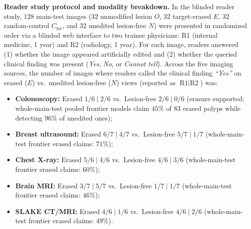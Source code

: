 \documentclass[5p,times,twocolumn,authoryear]{elsarticle}
\begin{document}
\textbf{Reader study protocol and modality breakdown.} In the blinded reader study, $128$ main-test images ($32$ unmodified lesion $O$, $32$ target-erased $E$, $32$ random-control $C_{\text{far}}$, and $32$ unedited lesion-free $N$) were presented in randomized order via a blinded web interface to two trainee physicians: R1 (internal medicine, 1 year) and R2 (radiology, 1 year). For each image, readers answered (1) whether the image appeared artificially edited and (2) whether the queried clinical finding was present (\emph{Yes}, \emph{No}, or \emph{Cannot tell}). Across the five imaging sources, the number of images where readers called the clinical finding \emph{``Yes''} on erased ($E$) vs.\ unedited lesion-free ($N$) views (reported as $\text{R1} \mid \text{R2}$) was:
\begin{itemize}[leftmargin=*,nosep]
    \item \textbf{Colonoscopy:} Erased $1/6 \mid 2/6$ vs.\ Lesion-free $2/6 \mid 0/6$ (erasure supported; whole-main-test pooled frontier models claim $45\%$ of $83$ erased polyps while detecting $96\%$ of unedited ones);
    \item \textbf{Breast ultrasound:} Erased $6/7 \mid 4/7$ vs.\ Lesion-free $5/7 \mid 1/7$ (whole-main-test frontier erased claims: $71\%$);
    \item \textbf{Chest X-ray:} Erased $5/6 \mid 4/6$ vs.\ Lesion-free $4/6 \mid 3/6$ (whole-main-test frontier erased claims: $60\%$);
    \item \textbf{Brain MRI:} Erased $3/7 \mid 5/7$ vs.\ Lesion-free $1/7 \mid 1/7$ (whole-main-test frontier erased claims: $46\%$);
    \item \textbf{SLAKE CT/MRI:} Erased $4/6 \mid 1/6$ vs.\ Lesion-free $4/6 \mid 2/6$ (whole-main-test frontier erased claims: $49\%$).
\end{itemize}
\end{document}
